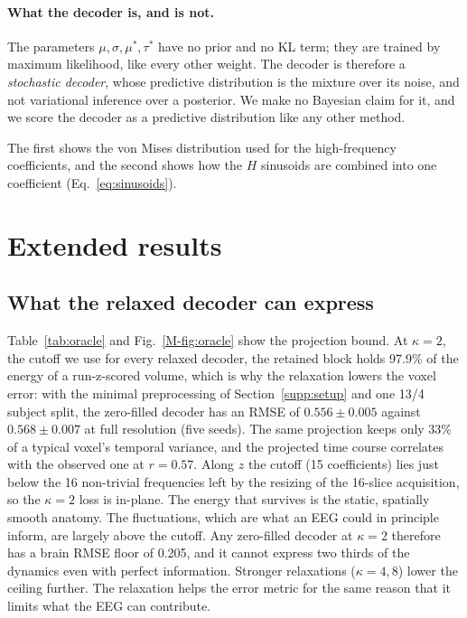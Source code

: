 \paragraph{What the decoder is, and is not.} The parameters $\mu,\sigma,\mu^*,\tau^*$ have no prior and no KL term; they are trained by maximum likelihood, like every other weight. The decoder is therefore a \emph{stochastic decoder}, whose predictive distribution is the mixture over its noise, and not variational inference over a posterior. We make no Bayesian claim for it, and we score the decoder as a predictive distribution like any other method.


The first shows the von Mises distribution used for the high-frequency coefficients, and the second shows how the $H$ sinusoids are combined into one coefficient (Eq.~\eqref{eq:sinusoids}).






\section{Extended results}\label{supp:results}
\subsection{What the relaxed decoder can express}\label{sec:res:oracle}


Table~\ref{tab:oracle} and Fig.~\ref{M-fig:oracle} show the projection bound. At $\kappa=2$, the cutoff we use for every relaxed decoder, the retained block holds 97.9\% of the energy of a run-z-scored volume, which is why the relaxation lowers the voxel error: with the minimal preprocessing of Section~\ref{supp:setup} and one 13/4 subject split, the zero-filled decoder has an RMSE of $0.556\pm0.005$ against $0.568\pm0.007$ at full resolution (five seeds). The same projection keeps only 33\% of a typical voxel's temporal variance, and the projected time course correlates with the observed one at $r=0.57$. Along $z$ the cutoff (15 coefficients) lies just below the 16 non-trivial frequencies left by the resizing of the 16-slice acquisition, so the $\kappa=2$ loss is in-plane. The energy that survives is the static, spatially smooth anatomy. The fluctuations, which are what an EEG could in principle inform, are largely above the cutoff. Any zero-filled decoder at $\kappa=2$ therefore has a brain RMSE floor of 0.205, and it cannot express two thirds of the dynamics even with perfect information. Stronger relaxations ($\kappa=4,8$) lower the ceiling further. The relaxation helps the error metric for the same reason that it limits what the EEG can contribute.

